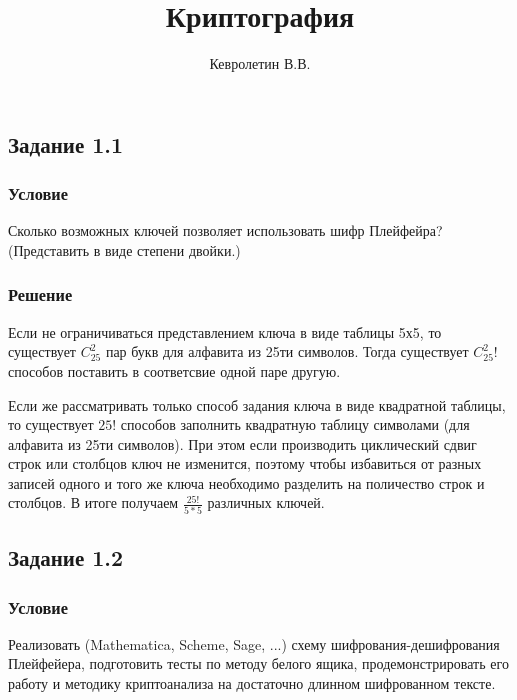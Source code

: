 \documentclass[10pt,a4paper]{article}
\author{Кевролетин В.В.}
\title{Криптография}
\begin{document}
\maketitle

\subsection*{Задание 1.1}
\subsubsection*{Условие}
Сколько возможных ключей позволяет использовать шифр Плейфейра?
(Представить в виде степени двойки.)

\subsubsection*{Решение}
Если не ограничиваться представлением ключа в виде таблицы 5х5, то
существует $ C_{25}^2 $ пар букв для алфавита из 25ти символов. Тогда
существует $ C_{25}^2! $ способов поставить в соответсвие одной паре
другую.

Если же рассматривать только способ задания ключа в виде
квадратной таблицы, то существует $ 25! $ способов заполнить
квадратную таблицу символами (для алфавита из 25ти символов). При этом
если производить циклический сдвиг строк или столбцов ключ не
изменится, поэтому чтобы избавиться от разных записей одного и того же
ключа необходимо разделить на поличество строк и столбцов. В итоге
получаем $ \frac{25!}{5*5} $ различных ключей. 

\subsection*{Задание 1.2}
\subsubsection*{Условие}
Реализовать (Mathematica, Scheme, Sage, ...) схему шифрования-дешифрования Плейфейера, подготовить тесты по методу белого ящика, продемонстрировать его работу и методику криптоанализа на достаточно длинном шифрованном тексте. 
\end{document}

